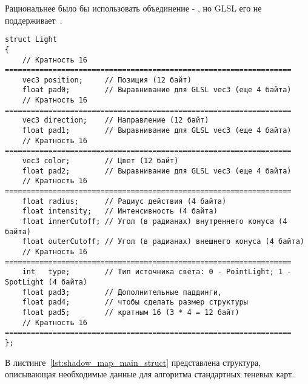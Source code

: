 Рациональнее было бы использовать объединение - , но GLSL его не
поддерживает~\cite{OpenGL_DevidVolf}.

\begin{center}
\captionsetup{justification=centering, singlelinecheck=off}
\begin{lstlisting}[label=lst:light_struct, caption={Источник освещения}]
struct Light
{
    // Кратность 16 ==================================================================
    vec3 position;     // Позиция (12 байт)
    float pad0;        // Выравнивание для GLSL vec3 (еще 4 байта)
    // Кратность 16 ==================================================================
    vec3 direction;    // Направление (12 байт)
    float pad1;        // Выравнивание для GLSL vec3 (еще 4 байта)
    // Кратность 16 ==================================================================
    vec3 color;        // Цвет (12 байт)
    float pad2;        // Выравнивание для GLSL vec3 (еще 4 байта)
    // Кратность 16 ==================================================================
    float radius;      // Радиус действия (4 байта)
    float intensity;   // Интенсивность (4 байта)
    float innerCutoff; // Угол (в радианах) внутреннего конуса (4 байта)
    float outerCutoff; // Угол (в радианах) внешнего конуса (4 байта)
    // Кратность 16 ==================================================================
    int   type;        // Тип источника света: 0 - PointLight; 1 - SpotLight (4 байта)
    float pad3;        // Дополнительные паддинги,
    float pad4;        // чтобы сделать размер структуры
    float pad5;        // кратным 16 (3 * 4 = 12 байт)
    // Кратность 16 ==================================================================
};
\end{lstlisting}
\end{center}

В листинге~\ref{lst:shadow_map_main_struct} представлена структура,
описывающая необходимые данные для алгоритма стандартных теневых карт.

